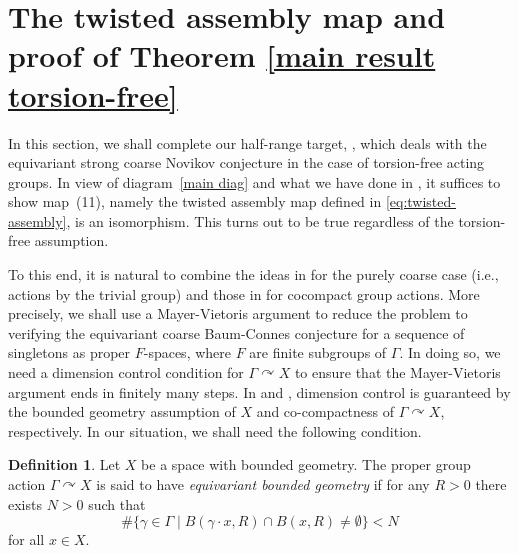 \documentclass[11pt]{article}
\theoremstyle{definition}
\newtheorem{Def}{Definition}[section]
\theoremstyle{plain}
\def\Ga{\Gamma}
\def\car{\curvearrowright}
\begin{document}
\section{The twisted assembly map and proof of Theorem \ref{main result torsion-free}}\label{sec: The twisted assembly map and proof of Theorem 1.3}

In this section, we shall complete our half-range target, , which deals with the equivariant strong coarse Novikov conjecture in the case of torsion-free acting groups. In view of diagram~\eqref{main diag} and what we have done in , it suffices to show map~(11), namely the twisted assembly map defined in \eqref{eq:twisted-assembly}, is an isomorphism. This turns out to be true regardless of the torsion-free assumption. 

To this end, it is natural to combine the ideas in \cite[Theorem 6.8]{Yu2000} for the purely coarse case (i.e., actions by the trivial group) and those in \cite[Theorem 13.1]{GHT2000} for cocompact group actions. More precisely, we shall use a Mayer-Vietoris argument to reduce the problem to verifying the equivariant coarse Baum-Connes conjecture for a sequence of singletons as proper $F$-spaces, where $F$ are finite subgroups of $\Gamma$. In doing so, we need a dimension control condition for $\Ga\car X$ to ensure that the Mayer-Vietoris argument ends in finitely many steps. In \cite{Yu2000} and \cite{GHT2000}, dimension control is guaranteed by the bounded geometry assumption of $X$ and co-compactness of $\Ga\car X$, respectively. In our situation, we shall need the following condition.

\begin{Def}\label{ebg}
Let $X$ be a space with bounded geometry.
The proper group action $\Ga\car X$ is said to have \emph{equivariant bounded geometry} if for any $R>0$ there exists $N>0$ such that 
$$\#\{\gamma\in\Ga\mid B(\gamma\cdot x,R)\cap B(x,R)\ne\emptyset\}<N$$
for all $x\in X$.
\end{Def}
\end{document}
